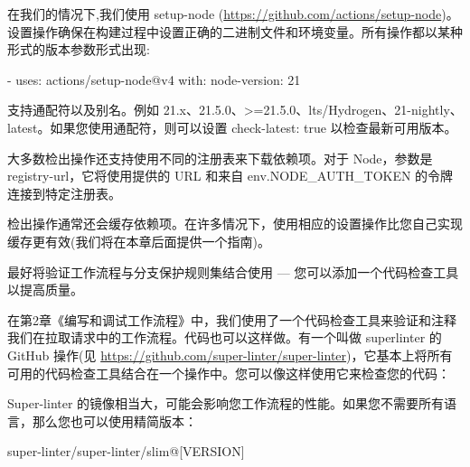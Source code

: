 在我们的情况下,我们使用 setup-node (\url{https://github.com/actions/setup-node})。设置操作确保在构建过程中设置正确的二进制文件和环境变量。所有操作都以某种形式的版本参数形式出现:

\begin{shell}
- uses: actions/setup-node@v4
  with:
    node-version: 21
\end{shell}

支持通配符以及别名。例如 21.x、21.5.0、>=21.5.0、lts/Hydrogen、21-nightly、latest。如果您使用通配符，则可以设置 check-latest: true 以检查最新可用版本。

大多数检出操作还支持使用不同的注册表来下载依赖项。对于 Node，参数是 registry-url，它将使用提供的 URL 和来自 env.NODE\_AUTH\_TOKEN 的令牌连接到特定注册表。

检出操作通常还会缓存依赖项。在许多情况下，使用相应的设置操作比您自己实现缓存更有效(我们将在本章后面提供一个指南)。


最好将验证工作流程与分支保护规则集结合使用 --- 您可以添加一个代码检查工具以提高质量。


在第2章《编写和调试工作流程》中，我们使用了一个代码检查工具来验证和注释我们在拉取请求中的工作流程。代码也可以这样做。有一个叫做 superlinter 的 GitHub 操作(见 \url{https://github.com/super-linter/super-linter})，它基本上将所有可用的代码检查工具结合在一个操作中。您可以像这样使用它来检查您的代码：


Super-linter 的镜像相当大，可能会影响您工作流程的性能。如果您不需要所有语言，那么您也可以使用精简版本：

\begin{shell}
super-linter/super-linter/slim@[VERSION]
\end{shell}

